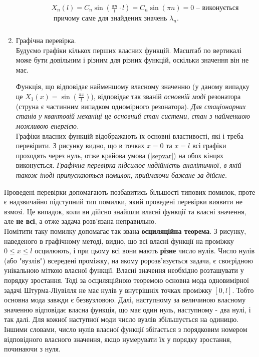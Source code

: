 \begin{enumerate}[wide, labelindent=0pt]
\begin{enumerate}
\begin{equation*}
\begin{aligned}
\begin{aligned}
                    &X_n(l) = C_n \sin\left(\frac{\pi n}{l} \cdot l\right) = C_n \sin(\pi n) = 0 \text{ -- виконується}\\
                    &\text{ причому саме для знайдених значень }\lambda_n.
                \end{aligned}\\
            \end{aligned}
        \end{equation*}
    \end{enumerate}
    \item Графічна перевірка.\\
    Будуємо графіки кількох перших власних функцій. Масштаб по вертикалі може бути довільним і різним для різних функцій, оскільки значення він не має.
    \begin{center}
        
    \end{center}
    Функція, що відповідає найменшому власному значенню (у даному випадку це $X_1(x) = \sin\left(\frac{\pi x}{l}\right)$), відповідає так званій \textit{основній моді} резонатора (струна є частинним випадком одномірного резонатора). \textit{Для стаціонарних станів у квантовій механіці це основний стан системи, стан з найменшою можливою енергією.}\\
    Графіки власних функцій відображають їх основні властивості, які і треба перевірити. З рисунку видно, що в точках $x = 0$ та $x = l$ всі графіки проходять через нуль, отже крайова умова (\ref{sepvar}) на обох кінцях виконується. \textit{Графічна перевірка підсилює надійність аналітичної, в якій також іноді припускаються помилок, приймаючи бажане за дійсне.}
\end{enumerate}

Проведені перевірки допомагають позбавитись більшості типових помилок, проте є надзвичайно підступний тип помилки, який проведені перевірки виявити не взмозі. Це випадок, коли ви дійсно знайшли власні функції та власні значення, але \textbf{не всі}, а отже задача розв'язана неправильно.\\
Помітити таку помилку допомагає так звана \textbf{осциляційна теорема}. З рисунку, наведеного в графічному методі, видно, що всі власні функції на проміжку $0 \leq x \leq l$ осцилюють, і при цьому всі вони мають \textbf{різне} число нулів. Число нулів (або "вузлів") всередені проміжку, на якому ророзв’язується задача, є своєрідною унікальною міткою власної функції. Власні значення необхідно розташувати у порядку зростання. Тоді за осциляційною теоремою основна мода одновимірної задачі Штурма-Ліувілля не має нулів у внутрішніх точках проміжку $[0, l]$. Тобто основна мода завжди є безвузловою. Далі, наступному за величиною власному значенню відповідає власна функція, що має один нуль, наступному - два нулі, і так далі. Для кожної наступної моди число вузлів збільшується на одиницю. Іншими словами, число нулів власної функції збігається з порядковим номером відповідного власного значення, якщо нумерувати їх у порядку зростання, починаючи з нуля.


